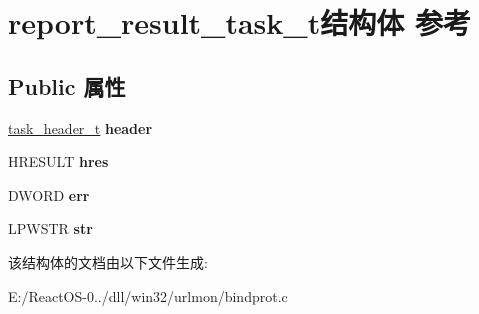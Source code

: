 \hypertarget{structreport__result__task__t}{}\section{report\+\_\+result\+\_\+task\+\_\+t结构体 参考}
\label{structreport__result__task__t}
\subsection*{Public 属性}
\begin{DoxyCompactItemize}
\item 
\mbox{\label{structreport__result__task__t_abc38ffb4fc27559e843b2223e41cd739}} 
\hyperlink{structtask__header__t}{task\+\_\+header\+\_\+t} {\bfseries header}
\item 
\mbox{\label{structreport__result__task__t_a50dae64f6775883aa0d341e8c098c53d}} 
H\+R\+E\+S\+U\+LT {\bfseries hres}
\item 
\mbox{\label{structreport__result__task__t_add7800a660c9be78ebd74e896088c377}} 
D\+W\+O\+RD {\bfseries err}
\item 
\mbox{\label{structreport__result__task__t_acd720e021e8c9ec2f4be76f41d43e5ed}} 
L\+P\+W\+S\+TR {\bfseries str}
\end{DoxyCompactItemize}


该结构体的文档由以下文件生成\+:\begin{DoxyCompactItemize}
\item 
E\+:/\+React\+O\+S-\/0../dll/win32/urlmon/bindprot.\+c\end{DoxyCompactItemize}
